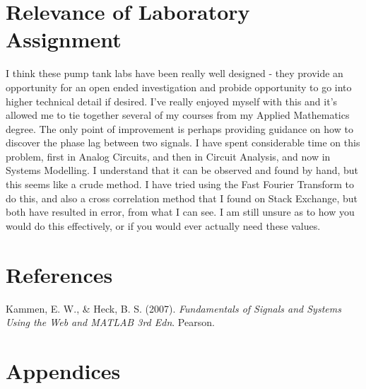 \documentclass{article}
\begin{document}
\newpage

\section{Relevance of Laboratory Assignment}
I think these pump tank labs have been really well designed - they provide an opportunity for an open ended investigation and probide opportunity to go into higher technical detail if desired. I've really enjoyed myself with this and it's allowed me to tie together several of my courses from my Applied Mathematics degree. The only point of improvement is perhaps providing guidance on how to discover the phase lag between two signals. I have spent considerable time on this problem, first in Analog Circuits, and then in Circuit Analysis, and now in Systems Modelling. I understand that it can be observed and found by hand, but this seems like a crude method. I have tried using the Fast Fourier Transform to do this, and also a cross correlation method that I found on Stack Exchange, but both have resulted in error, from what I can see. I am still unsure as to how you would do this effectively, or if you would ever actually need these values.


\section{References}
Kammen, E. W., \& Heck, B. S. (2007). \textit{Fundamentals of Signals and Systems Using the Web and MATLAB 3rd Edn}. Pearson.

\newpage


\section{Appendices}
\end{document}

